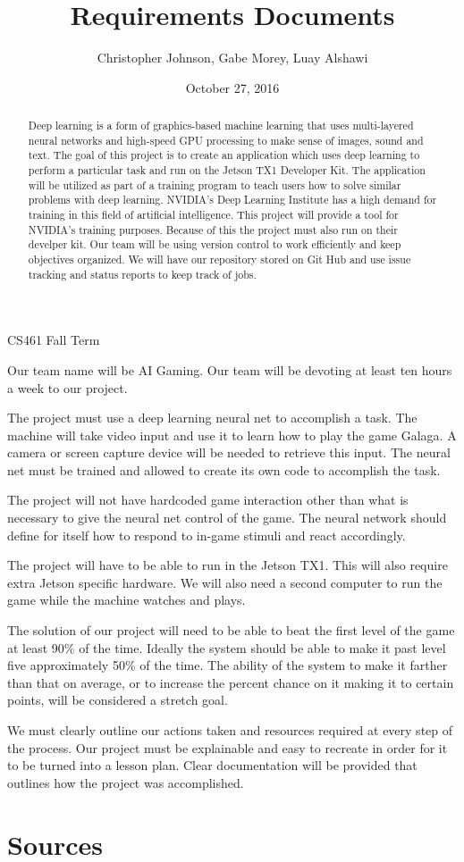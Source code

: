 \documentclass[letterpaper,10pt]{article}
\author{Christopher Johnson, Gabe Morey, Luay Alshawi}
\title{Requirements Documents}
\date{October 27, 2016}
\begin{document}
\begin{titlingpage}
\maketitle
CS461 Fall Term

\begin{abstract}
Deep learning is a form of graphics-based machine learning that uses multi-layered neural networks and high-speed 
GPU processing to make sense of images, sound and text. 
The goal of this project is to create an application which uses deep learning to perform a particular task and run on the Jetson TX1 Developer Kit.
The application will be utilized as part of a training program to teach users how to solve similar problems with deep learning. NVIDIA's Deep Learning Institute has a high demand for training in this field of artificial intelligence. 
This project will provide a tool for NVIDIA's training purposes. 
Because of this the project must also run on their develper kit.
Our team will be using version control to work efficiently and keep objectives organized. 
We will have our repository stored on Git Hub and use issue tracking and status reports to keep track of jobs.
\end{abstract}

\end{titlingpage}
Our team name will be AI Gaming.
Our team will be devoting at least ten hours a week to our project. 

The project must use a deep learning neural net to accomplish a task.
The machine will take video input and use it to learn how to play the game Galaga. 
A camera or screen capture device will be needed to retrieve this input. 
The neural net must be trained and allowed to create its own code to accomplish the task.

The project will not have hardcoded game interaction other than what is necessary to give the neural net control of the game.
The neural network should define for itself how to respond to in-game stimuli and react accordingly.

The project will have to be able to run in the Jetson TX1. 
This will also require extra Jetson specific hardware.
We will also need a second computer to run the game while the machine watches and plays.

The solution of our project will need to be able to beat the first level of the game at least 90\% of the time. 
Ideally the system should be able to make it past level five approximately 50\% of the time.
The ability of the system to make it farther than that on average, or to increase the percent chance on it making it to certain points, will be considered a stretch goal.

We must clearly outline our actions taken and resources required at every step of the process.
Our project must be explainable and easy to recreate in order for it to be turned into a lesson plan.
Clear documentation will be provided that outlines how the project was accomplished.

\section{Sources}
\end{document}

